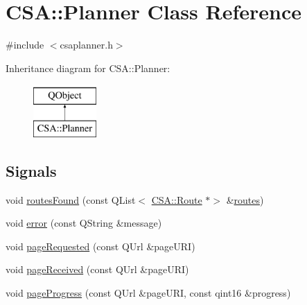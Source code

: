\hypertarget{classCSA_1_1Planner}{}\section{C\+SA\+:\+:Planner Class Reference}
\label{classCSA_1_1Planner}


{\ttfamily \#include $<$csaplanner.\+h$>$}

Inheritance diagram for C\+SA\+:\+:Planner\+:\begin{figure}[H]
\begin{center}
\leavevmode
\includegraphics[height=2.000000cm]{classCSA_1_1Planner}
\end{center}
\end{figure}
\subsection*{Signals}
\begin{DoxyCompactItemize}
\item 
void \mbox{\hyperlink{classCSA_1_1Planner_aef9242efc2f34759d0bc58da60b10baf}{routes\+Found}} (const Q\+List$<$ \mbox{\hyperlink{classCSA_1_1Route}{C\+S\+A\+::\+Route}} $\ast$$>$ \&\mbox{\hyperlink{classCSA_1_1Planner_a1ecc41dc060aafd6e2ce0f2c4a52648b}{routes}})
\item 
void \mbox{\hyperlink{classCSA_1_1Planner_a4057e2f24927818deb1857c47a5008cf}{error}} (const Q\+String \&message)
\item 
void \mbox{\hyperlink{classCSA_1_1Planner_a54e3e7049b018f3cd08697e39149add3}{page\+Requested}} (const Q\+Url \&page\+U\+RI)
\item 
void \mbox{\hyperlink{classCSA_1_1Planner_af9fcdc9efcb27c4e45ddc36367a1364c}{page\+Received}} (const Q\+Url \&page\+U\+RI)
\item 
void \mbox{\hyperlink{classCSA_1_1Planner_a987cbbe8316beb1db2983ac62ccbed03}{page\+Progress}} (const Q\+Url \&page\+U\+RI, const qint16 \&progress)
\end{DoxyCompactItemize}
